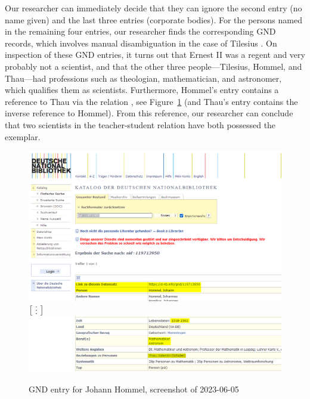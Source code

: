 Our researcher can immediately decide that they can ignore the second entry (no name given) and the last three entries (corporate bodies).
For the persons named in the remaining four entries, our researcher finds the corresponding \gls{GND} records, which involves manual disambiguation in the case of Tilesius
\autocite{GNDTilesius,GNDHommel,GNDThau,GNDErnstII}.
On inspection of these \gls{GND} entries, it turns out that Ernest II was a regent and very probably not a scientist,
and that the other three people---Tilesius, Hommel, and Thau---had professions such as theologian,
mathematician, and astronomer, which qualifies them as scientists. Furthermore, Hommel's entry 
contains a reference to Thau via the relation , see Figure~\ref{fig:GND_Hommel}
(and Thau's entry contains the inverse reference to Hommel).
From this reference, our researcher can conclude that two scientists in the teacher-student relation
have both possessed the exemplar. 

\begin{figure}[ht]
  \centering
  \includegraphics[width=\linewidth]{img/gnd_hommel_1.png}
  $\big[\raisebox{-1.8pt}{\rvdots}\big]$
  \includegraphics[width=\linewidth]{img/gnd_hommel_2.png}
  \caption{GND entry for Johann Hommel, screenshot of 2023-06-05}
  \label{fig:GND_Hommel}
\end{figure}

